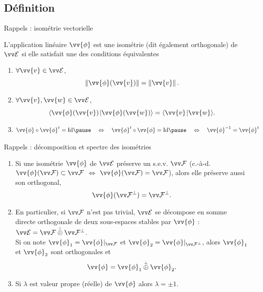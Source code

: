 \documentclass{m53beamer}
\begin{document}
\subsection{Définition}
\begin{frame}{Rappels : isométrie vectorielle }
  \begin{defprop}
    L'application linéaire $\vv{\phi}$ est une \alert{isométrie} (dit également \alert{orthogonale}) de $\ev{E}$ si elle satisfait une des conditions équivalentes
    \begin{enumerate}[<+(1)->]
      \item $\forall \vv{v} \in \ev{E}$,
        \[
           \norm{\vv{\phi}(\vv{v})}=\norm{\vv{v}}.
        \]
      \item $\forall \vv{v},\vv{w} \in \ev{E}$,
        \[
          \scalprod{\vv{\phi}(\vv{v})}{\vv{\phi}(\vv{w})}=\scalprod{\vv{v}}{\vv{w}}.
        \]
      \item
        \[
          \vv{\phi}\circ\vv{\phi}^{t} = \id \pause\quad\Leftrightarrow\quad
          \vv{\phi}^{t}\circ\vv{\phi} = \id \pause\quad\Leftrightarrow\quad
          \vv{\phi}^{-1} = \vv{\phi}^{t}
        \]\forsimple{\vspace*{-.7\baselineskip}}
    \end{enumerate}
  \end{defprop}
\end{frame}

\begin{frame}{Rappels : décomposition et spectre des isométries }
  \begin{enumerate}[<+(1)->]
    \item Si une isométrie $\vv{\phi}$ de $\ev{E}$ préserve un s.e.v. $\ev{F}$ \pause(c.-à-d. $\vv{\phi}(\ev{F})\subset\ev{F}$ $\Leftrightarrow$ $\vv{\phi}(\ev{F})=\ev{F}$)\pause, alors elle préserve aussi son orthogonal\pause,
      \[
        \vv{\phi}(\ev{F}^{\perp})=\ev{F}^{\perp}.
      \]
    \item En particulier, si $\ev{F}$ n'est pas trivial, $\ev{E}$ se décompose en somme directe orthogonale de deux sous-espaces stables par $\vv{\phi}$ : $\ev{E}=\ev{F}\poplus\ev{F}^{\perp}$.\pause\\
    Si on note $\vv{\phi}_{1} = \vv{\phi}|_{\ev{F}}$ et $\vv{\phi}_{2} = \vv{\phi}|_{\ev{F}^{\perp}}$, alors $\vv{\phi}_{1}$ et $\vv{\phi}_{2}$ sont orthogonales et
      \[
        \vv{\phi}=\vv{\phi}_{1}\poplus\vv{\phi}_{2}.
      \]
    \item Si $\lambda$ est valeur propre (réelle) de $\vv{\phi}$ alors $\lambda = \pm 1$.
  \end{enumerate}
\end{frame}
\end{document}
